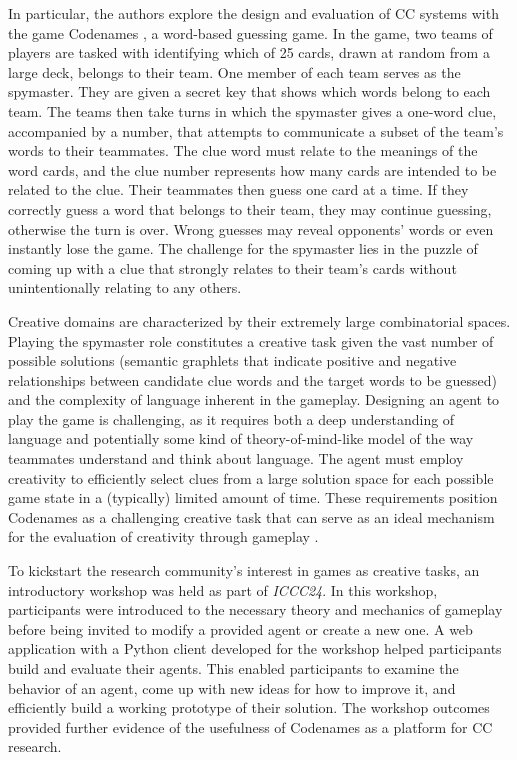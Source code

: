 \documentclass[phd,electronic,oneside,twosidetoc,letterpaper,chaptercenter,parttop,lof]{byumsphd}
\begin{document}
In particular, the authors explore the design and evaluation of CC systems with the game Codenames \cite{codenames2015}, a word-based guessing game. In the game, two teams of players are tasked with identifying which of 25 cards, drawn at random from a large deck, belongs to their team. One member of each team serves as the spymaster. They are given a secret key that shows which words belong to each team.  The teams then take turns in which the spymaster gives a one-word clue, accompanied by a number, that attempts to communicate a subset of the team's words to their teammates. The clue word must relate to the meanings of the word cards, and the clue number represents how many cards are intended to be related to the clue. Their teammates then guess one card at a time. If they correctly guess a word that belongs to their team, they may continue guessing, otherwise the turn is over. Wrong guesses may reveal opponents' words or even instantly lose the game. The challenge for the spymaster lies in the puzzle of coming up with a clue that strongly relates to their team's cards without unintentionally relating to any others.

Creative domains are characterized by their extremely large combinatorial spaces. Playing the spymaster role constitutes a creative task given the vast number of possible solutions (semantic graphlets that indicate positive and negative relationships between candidate clue words and the target words to be guessed) and the complexity of language inherent in the gameplay. Designing an agent to play the game is challenging, as it requires both a deep understanding of language and potentially some kind of theory-of-mind-like model of the way teammates understand and think about language.  The agent must employ creativity to efficiently select clues from a large solution space for each possible game state in a (typically) limited amount of time. These requirements position Codenames as a challenging creative task that can serve as an ideal mechanism for the evaluation of creativity through gameplay \cite{spendlove2023}.

To kickstart the research community's interest in games as creative tasks, an introductory workshop was held as part of \emph{ICCC24}. In this workshop, participants were introduced to the necessary theory and mechanics of gameplay before being invited to modify a provided agent or create a new one. A web application with a Python client developed for the workshop helped participants build and evaluate their agents. This enabled participants to examine the behavior of an agent, come up with new ideas for how to improve it, and efficiently build a working prototype of their solution. The workshop outcomes provided further evidence of the usefulness of Codenames as a platform for CC research.
\end{document}
